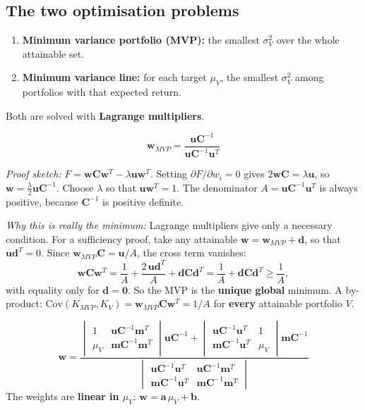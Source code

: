 \documentclass[titlepage,11pt,a4paper]{article}
\newcommand{\Cov}{\mathrm{Cov}}
\newcommand{\vw}{\boldsymbol{w}}
\newcommand{\vm}{\boldsymbol{m}}
\newcommand{\vu}{\boldsymbol{u}}
\newcommand{\vC}{\boldsymbol{C}}
\newcommand{\T}{^{T}}
\newcommand{\Ci}{\vC^{-1}}
\begin{document}
\subsection{The two optimisation problems}
\begin{enumerate}
  \item \textbf{Minimum variance portfolio (MVP):} the smallest $\sigma_V^2$ over the whole attainable set.
  \item \textbf{Minimum variance line:} for each target $\mu_V$, the smallest $\sigma_V^2$ among portfolios with that expected return.
\end{enumerate}
Both are solved with \textbf{Lagrange multipliers}.

\begin{result}
\[\vw_{MVP}=\frac{\vu\Ci}{\vu\Ci\vu\T}\]
\end{result}

\emph{Proof sketch:} $F=\vw\vC\vw\T-\lambda\vu\vw\T$. Setting $\partial F/\partial w_i=0$ gives $2\vw\vC=\lambda\vu$, so $\vw=\tfrac{\lambda}{2}\vu\Ci$. Choose $\lambda$ so that $\vu\vw\T=1$. The denominator $A=\vu\Ci\vu\T$ is always positive, because $\Ci$ is positive definite.

\emph{Why this is really the minimum:} Lagrange multipliers give only a necessary condition. For a sufficiency proof, take any attainable $\vw=\vw_{MVP}+\boldsymbol d$, so that $\vu\boldsymbol d\T=0$. Since $\vw_{MVP}\vC=\vu/A$, the cross term vanishes:
\[\vw\vC\vw\T=\frac1A+\frac{2\,\vu\boldsymbol d\T}{A}+\boldsymbol d\vC\boldsymbol d\T=\frac1A+\boldsymbol d\vC\boldsymbol d\T\ge\frac1A,\]
with equality only for $\boldsymbol d=\boldsymbol 0$. So the MVP is the \textbf{unique global} minimum. A by-product: $\Cov(K_{MVP},K_V)=\vw_{MVP}\vC\vw\T=1/A$ for \textbf{every} attainable portfolio $V$.

\begin{result}
{\small
\[\vw=\frac{\begin{vmatrix}1 & \vu\Ci\vm\T\\ \mu_V & \vm\Ci\vm\T\end{vmatrix}\vu\Ci+\begin{vmatrix}\vu\Ci\vu\T & 1\\ \vm\Ci\vu\T & \mu_V\end{vmatrix}\vm\Ci}{\begin{vmatrix}\vu\Ci\vu\T & \vu\Ci\vm\T\\ \vm\Ci\vu\T & \vm\Ci\vm\T\end{vmatrix}}\]}
The weights are \textbf{linear in $\mu_V$}: $\vw=\boldsymbol a\,\mu_V+\boldsymbol b$.
\end{result}
\end{document}
